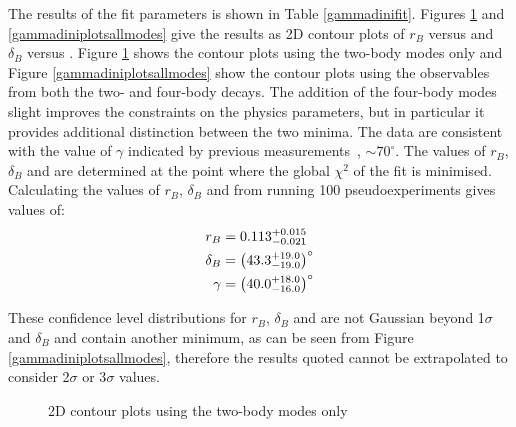 The results of the fit parameters is shown in Table \ref{gammadinifit}. Figures \ref{gammadiniplots2body} and \ref{gammadiniplotsallmodes} give the results as 2D contour plots of $r_B$ versus \Pgamma and $\delta_B$ versus \Pgamma. Figure \ref{gammadiniplots2body} shows the contour plots using the two-body modes only and Figure \ref{gammadiniplotsallmodes} show the contour plots using the observables from both the two- and four-body decays. The addition of the four-body modes slight improves the constraints on the physics parameters, but in particular it provides additional distinction between the two minima. The data are consistent with the value of $\gamma$ indicated by previous measurements~\cite{LHCb-PAPER-2016-032, CKMFitter}, $\sim 70^\circ$. The values of $r_B$, $\delta_B$ and \Pgamma are determined at the point where the global $\chi^2$ of the fit is minimised. Calculating the values of $r_B$, $\delta_B$ and \Pgamma from running 100 pseudoexperiments gives values of:
\begin{align*}
r_B &= 0.113^{+0.015}_{-0.021} \\
\delta_B &= \left(43.3^{+19.0}_{-19.0}\right)^{\circ} \\
\gamma &= \left(40.0^{+18.0}_{-16.0}\right)^{\circ} 
\end{align*}

These confidence level distributions for $r_B$, $\delta_B$ and \Pgamma are not Gaussian beyond 1$\sigma$ and $\delta_B$ and \Pgamma contain another minimum, as can be seen from Figure \ref{gammadiniplotsallmodes}, therefore the results quoted cannot be extrapolated to consider 2$\sigma$ or 3$\sigma$ values. 

\begin{figure}[h]
\centering
{}
\caption{2D contour plots using the two-body modes only}
\label{gammadiniplots2body}
\end{figure}

